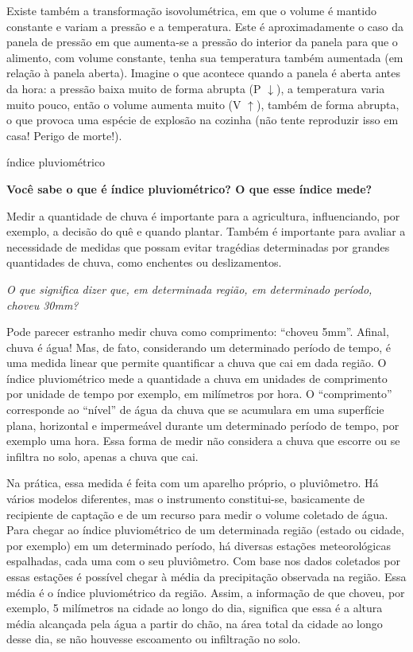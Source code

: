 \begin{reflection}{}
Existe também a transformação isovolumétrica, em que o volume é mantido constante e variam a pressão e a temperatura. Este é aproximadamente o caso da panela de pressão em que aumenta-se a pressão do interior da panela para que o alimento, com volume constante, tenha sua temperatura também aumentada (em relação à panela aberta). Imagine o que acontece quando a panela é aberta antes da hora: a pressão baixa muito de forma abrupta (P \(\downarrow\)), a temperatura varia muito pouco, então o volume aumenta muito (V \(\uparrow\)), também de forma abrupta, o que provoca uma espécie de explosão na cozinha (não tente reproduzir isso em casa! Perigo de morte!).
\end{reflection}

\begin{task}{índice pluviométrico}



\textbf{Você sabe o que é índice pluviométrico? O que esse índice mede?}

Medir a quantidade de chuva é importante para a agricultura, influenciando, por exemplo, a decisão do quê e quando plantar.  Também é importante para avaliar a necessidade de medidas que possam evitar tragédias determinadas por grandes quantidades de chuva, como enchentes ou deslizamentos.

\emph{O que significa dizer que, em determinada região, em determinado período, choveu 30mm?}

Pode parecer estranho medir chuva como comprimento: “choveu 5mm”. Afinal, chuva é água! Mas, de fato, considerando um determinado período de tempo, é uma medida linear que permite quantificar a chuva que cai em dada região. O índice pluviométrico mede a quantidade a chuva em unidades de comprimento por unidade de tempo \textendash{} por exemplo, em milímetros por hora. O “comprimento” corresponde ao “nível” de água da chuva que se acumulara em uma superfície plana, horizontal e impermeável durante um determinado período de tempo, por exemplo uma hora. Essa forma de medir não considera a chuva que escorre ou se infiltra no solo, apenas a chuva que cai.

Na prática, essa medida é feita com um aparelho próprio, o pluviômetro. Há vários modelos diferentes, mas o instrumento constitui-se, basicamente de recipiente de captação e de um recurso para medir o volume coletado de água. Para chegar ao índice pluviométrico de um determinada região (estado ou cidade, por exemplo) em um determinado período, há diversas estações meteorológicas espalhadas, cada uma com o seu pluviômetro. Com base nos dados coletados por essas estações é possível chegar à média da precipitação observada na região. Essa média é o índice pluviométrico da região. Assim, a informação de que choveu, por exemplo, 5 milímetros na cidade ao longo do dia, significa que essa é a altura média alcançada pela água a partir do chão, na área total da cidade ao longo desse dia, se não houvesse escoamento ou infiltração no solo.


\end{task}
